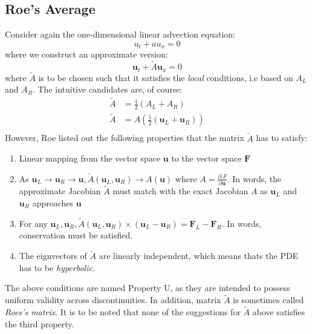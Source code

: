 \documentclass[a4paper]{article}
\numberwithin{equation}{section}
\begin{document}
\subsection{Roe's Average}
Consider again the one-dimensional linear advection equation:
\begin{equation}
    u_t + au_x = 0
\end{equation}
where we construct an approximate version:
\begin{equation}
    \mathbf{u}_t + \tilde{A}\mathbf{u}_x = 0
\end{equation}
where $\tilde{A}$ is to be chosen such that it satisfies the \textit{local} conditions, i.e based on $A_L$ and $A_R$. The intuitive candidates are, of course:
\begin{equation}
    \begin{split}
        \tilde{A} &= \frac{1}{2}(A_L + A_R)\\
        \tilde{A} &= A(\frac{1}{2}(\mathbf{u}_L + \mathbf{u}_R))\\
    \end{split}
\end{equation}
However, Roe listed out the following properties that the matrix $\tilde{A}$ has to satisfy:
\begin{enumerate}
    \item Linear mapping from the vector space $\mathbf{u}$ to the vector space $\mathbf{F}$
    \item As $\mathbf{u}_L \rightarrow \mathbf{u}_R \rightarrow \mathbf{u}, \tilde{A}(\mathbf{u}_L,\mathbf{u}_R) \rightarrow A(\mathbf{u})$ where $A = \frac{\partial \mathbf.
    F}{\partial \mathbf{u}}$. In words, the approximate Jacobian $\tilde{A}$ must match with the exact Jacobian $A$ as $\mathbf{u}_L$ and $\mathbf{u}_R$ approaches $\mathbf{u}$
    \item For any $\mathbf{u}_L, \mathbf{u}_R, \tilde{A}(\mathbf{u}_L, \mathbf{u}_R)\times (\mathbf{u}_L - \mathbf{u}_R) = \mathbf{F}_L - \mathbf{F}_R$. In words, conservation must be satisfied.
    \item The eignvectors of $\tilde{A}$ are linearly independent, which means thats the PDE has to be \textit{hyperbolic}.

\end{enumerate}
The above conditions are named Property U, as they are intended to possess uniform validity across discontinuities. In addition, matrix $\tilde{A}$ is sometimes called \textit{Roes's matrix}. It is to be noted that none of the suggestions for $\tilde{A}$ above satisfies the third property. 
\end{document}
